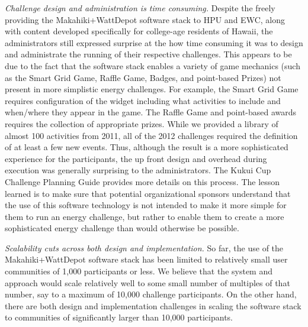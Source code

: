 {\em Challenge design and administration is time consuming.} Despite the freely providing the Makahiki+WattDepot software stack to HPU and EWC, along with content developed specifically for college-age residents of Hawaii, the administrators still expressed surprise at the how time consuming it was to design and administrate the running of their respective challenges.  This appears to be due to the fact that the software stack enables a variety of game mechanics (such as the Smart Grid Game, Raffle Game, Badges, and point-based Prizes) not present in more simplistic energy challenges.  For example, the Smart Grid Game requires configuration of the widget including what activities to include and when/where they appear in the game.  The Raffle Game and point-based awards requires the collection of appropriate prizes. While we provided a library of almost 100 activities from 2011, all of the 2012 challenges required the definition of at least a few new events.  Thus, although the result is a more sophisticated experience for the participants, the up front design and overhead during execution was generally surprising to the administrators. The Kukui Cup Challenge Planning Guide \cite{KukuiCupChallengePlanningGuide} provides more details on this process.  The lesson learned is to make sure that potential organizational sponsors understand that the use of this software technology is not intended to make it more simple for them to run an energy challenge, but rather to enable them to create a more sophisticated energy challenge than would otherwise be possible.

{\em Scalability cuts across both design and implementation.}  So far, the use of the Makahiki+WattDepot software stack has been limited to relatively small user communities of 1,000 participants or less.  We believe that the system and approach would scale relatively well to some small number of multiples of that number, say to a maximum of 10,000 challenge participants.  On the other hand, there are both design and implementation challenges in scaling the software stack to communities of significantly larger than 10,000 participants.


